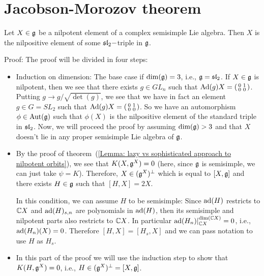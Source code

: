 \section{Jacobson-Morozov theorem}

\begin{dang}
    \begin{theorem}
        Let $X\in\mathfrak{g}$ be a nilpotent element of a complex semisimple Lie algebra. Then $X$ is the nilpositive element
        of some $\mathfrak{sl}_2-$triple in $\mathfrak{g}$.
    \end{theorem}
\end{dang}
Proof: The proof will be divided in four steps:
\begin{itemize}
    \item Induction on dimension: The base case if $\dim(\mathfrak{g})=3$, i.e., $\mathfrak{g}=\mathfrak{sl}_2$. If $X\in\mathfrak{g}$ is nilpotent, then 
    we see that there exists $g\in GL_n$ such that 
    $\text{Ad}(g)X=\left(\begin{smallmatrix}0&1\\0&0\end{smallmatrix}\right)$. Putting $g\to g/\sqrt{\det(g)}$, we see that we have 
    in fact an element $g\in G=SL_2$ such that $\text{Ad}(g)X=\left(\begin{smallmatrix}0&1\\0&0\end{smallmatrix}\right)$. So 
    we have an automorphism $\phi\in\text{Aut}(\mathfrak{g})$ such that $\phi(X)$ is the nilpositive element of the standard triple 
    in $\mathfrak{sl}_2$. Now, we will proceed the proof by assuming $\dim(\mathfrak{g})>3$ and that 
    $X$ doesn't lie in any proper semisimple Lie algebra of $\mathfrak{g}$.
    \item By the proof of theorem~(\ref{Lemma: lazy vs sophisticated approach to nilpotent orbits}), we see that 
    $K(X,\mathfrak{g}^X)=0$ (here, since $\mathfrak{g}$ is semisimple, we can just take $\psi=K$). Therefore, $X\in(\mathfrak{g}^X)^\perp$
    which is equal to $[X,\mathfrak{g}]$ and there exists $H\in\mathfrak{g}$ such that $[H,X]=2X$. \par
    In this condition, we can assume $H$ to be semisimple: Since $\text{ad}(H)$ restricts to $\mathbb{C} X$ and $\text{ad}(H)_{s,n}$ are 
    polynomials in $\text{ad}(H)$, then its semisimple and nilpotent parts also restricts to $\mathbb{C} X$. In particular 
    $\text{ad}(H_n)|_{\mathbb{C} X}^{\dim (\mathbb{C} X)}=0$, i.e., $\text{ad}(H_n)(X)=0$. Therefore $[H,X]=[H_s,X]$ and we can pass notation to 
    use $H$ as $H_s$.
    \item In this part of the proof we will use the induction step to show that $K(H,\mathfrak{g}^X)=0$, i.e., 
    $H\in(\mathfrak{g}^X)^\perp=[X,\mathfrak{g}]$.\par 


\end{itemize}
